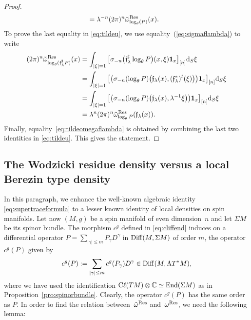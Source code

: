 \documentclass[pdftex]{sigma}
\numberwithin{equation}{section}
\theoremstyle{definition}
\newcommand{\Cl}{{\rm C}\ell}
\begin{document}
\begin{proof}
\begin{align*}
 &{}= \lambda^{-n} (2\pi)^n \tilde \omega^{\rm Res}_{ \log_\theta( P)}(x).
\end{align*}
To prove the last equality in \eqref{eq:tildeu}, we use equality~(\ref{eq:sigmaflambda}) to write
\begin{align*}
(2\pi)^n \tilde \omega^{\rm Res}_{\log_\theta (\mathfrak{f}_\lambda^\sharp P)}(x)&{}=\int_{\vert \xi\vert=1} \big[ \sigma_{-n}\bigl( { {\mathfrak f}}_{ \lambda}^\sharp \log_\theta P\bigr)(x,\xi) {\bf 1}_x \big]_{[n]} {\rm d}_S\xi\\
&{}=\int_{\vert \xi\vert=1} \big[ \bigl(\sigma_{ {-n}}({ \log_\theta P}) \bigl({ { {\mathfrak f}}_{ \lambda}(x)},({\mathfrak f}_{ \lambda}^*)^t (\xi) \bigr) \bigr) {\bf 1}_x \big]_{[n]} {\rm d}_S\xi \\
&{}=\int_{\vert \xi\vert=1} \big[ \bigl(\sigma_{ {-n}}({ \log_\theta P}) \bigl({ { {\mathfrak f}}_{ \lambda}(x)},\lambda^{-1}\xi \bigr) \bigr) {\bf 1}_x \big]_{[n]} {\rm d}_S\xi \\
&{}=\lambda^n (2\pi)^n \tilde \omega^{\rm Res}_{\log_\theta P}({\mathfrak f}_{ \lambda}(x)).
\end{align*}
Finally, equality~\eqref{eq:tildeomegaflambda} is obtained by combining the last two identities in \eqref{eq:tildeu}. This gives the statement.
\end{proof}

\subsection{The Wodzicki residue density versus a local Berezin type density } %
In this paragraph, we enhance the well-known algebraic identity \eqref{eq:supertraceformula} to a lesser known identity of local densities on spin manifolds. Let now $(M,g)$ be a spin manifold of even dimension~$n$ and let $\Sigma M$ be its spinor bundle. The morphism $c^g$ defined in \eqref{eq:cliffend} induces on a differential operator $P=\sum_{|\gamma|\leq m} P_\gamma D^\gamma$ in ${\rm Diff}(M,\Sigma M)$ of order $m$, the operator $c^g(P)$ given by
\begin{equation}\label{eq:cgp}
 c^g(P):=\sum_{|\gamma|\leq m} c^g ( P_\gamma) D^\gamma
\in {\rm Diff}(M, \Lambda T^*M),
\end{equation}
where we have used the identification $\Cl(TM)\otimes\mathbb{C}\simeq \operatorname{End}(\Sigma M)$ as in Proposition~\ref{pro:spinorbundle}. Clearly, the operator $c^g(P)$ has the same order as $P$. In order to find the relation between~$\tilde\omega^{\rm Res}$ and~$\omega^{\rm Res}$, we need the following lemma:
\end{document}
